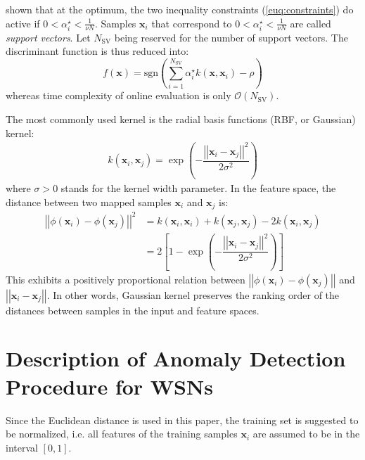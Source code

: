 \documentclass[conference]{IEEEtran}
\begin{document}
\cite{scholkopf2001estimating} shown that at the optimum, the two inequality constraints (\ref{euq:constraints}) do active if $0<\alpha_i^\star<\frac{1}{\nu N}$. Samples $\mathbf{x}_i$ that correspond to $0<\alpha_i^\star<\frac{1}{\nu N}$ are called \emph{support vectors}.  Let $N_\text{SV}$ being reserved for the number of support vectors. The discriminant function is thus reduced into:
\begin{equation}
\label{eq:ocsvm_fcn}
f(\mathbf{x})=\text{sgn} \left( \sum_{i=1}^{N_\text{SV}} \alpha_i^\star k (\mathbf{x}, \mathbf{x}_i )- \rho \right)
\end{equation}
whereas time complexity of online evaluation is only $\mathcal{O} (N_\text{SV})$.

The most commonly used kernel is the radial basis functions (RBF, or Gaussian) kernel:
\begin{align}
k \left( \mathbf{x}_i, \mathbf{x}_j\right) = \exp \left( - \dfrac{\left|\left| \mathbf{x}_i - \mathbf{x}_j \right|\right|^2}{2 \sigma^2} \right)
\end{align}
where $\sigma > 0$ stands for the kernel width parameter. In the feature space, the distance between two mapped samples $\mathbf{x}_i$ and $\mathbf{x}_j$ is:
\begin{align}
\left|\left| \phi \left( \mathbf{x}_i \right) - \phi \left( \mathbf{x}_j \right) \right|\right|^2 &= k \left( \mathbf{x}_i, \mathbf{x}_i\right) + k \left( \mathbf{x}_j, \mathbf{x}_j\right) - 2 k \left( \mathbf{x}_i, \mathbf{x}_j\right) \nonumber \\
&= 2 \left[ 1 -  \exp \left( - \dfrac{\left|\left| \mathbf{x}_i - \mathbf{x}_j \right|\right|^2}{2 \sigma^2}  \right) \right]
\end{align}
This exhibits a positively proportional relation between $\left|\left| \phi \left( \mathbf{x}_i \right) - \phi \left( \mathbf{x}_j \right) \right|\right|$ and $\left|\left| \mathbf{x}_i - \mathbf{x}_j \right|\right|$. In other words, Gaussian kernel preserves the ranking order of the distances between samples in the input and feature spaces.

\section{Description of Anomaly Detection Procedure for WSNs}\label{sec:implementation}

Since the Euclidean distance is used in this paper, the training set is suggested to be normalized, i.e. all features of the training samples $\mathbf{x}_i$ are assumed to be in the interval $\left[ 0, 1 \right]$.
\end{document}
